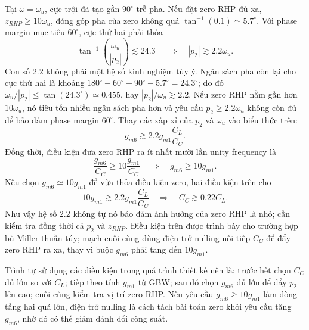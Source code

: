 \documentclass[11pt,a4paper]{report}
\newcommand{\ang}[1]{\ensuremath{#1^{\circ}}}
\begin{document}
Tại $\omega=\omega_u$, cực trội đã tạo gần \ang{90} trễ pha. Nếu đặt zero RHP
đủ xa, $z_{RHP}\ge10\omega_u$, đóng góp pha của zero không quá
$\tan^{-1}(0.1)\simeq\ang{5.7}$. Với phase margin mục tiêu \ang{60}, cực thứ
hai phải thỏa
\begin{equation}
\tan^{-1}\!\left(\frac{\omega_u}{|p_2|}\right)
\lesssim\ang{24.3}
\quad\Longrightarrow\quad
|p_2|\gtrsim2.2\omega_u.
\end{equation}
Con số $2.2$ không phải một hệ số kinh nghiệm tùy ý. Ngân sách pha còn lại cho
cực thứ hai là khoảng
$\ang{180}-\ang{60}-\ang{90}-\ang{5.7}=\ang{24.3}$; do đó
$\omega_u/|p_2|\le\tan(\ang{24.3})\simeq0.455$, hay
$|p_2|/\omega_u\gtrsim2.2$. Nếu zero RHP nằm gần hơn $10\omega_u$, nó tiêu tốn
nhiều ngân sách pha hơn và yêu cầu $p_2\ge2.2\omega_u$ không còn đủ để bảo đảm
phase margin \ang{60}.
Thay các xấp xỉ của $p_2$ và $\omega_u$ vào biểu thức trên:
\begin{equation}
\boxed{g_{m6}\gtrsim2.2g_{m1}\frac{C_L}{C_C}}.
\end{equation}
Đồng thời, điều kiện đưa zero RHP ra ít nhất mười lần unity frequency là
\begin{equation}
\frac{g_{m6}}{C_C}\ge10\frac{g_{m1}}{C_C}
\quad\Longrightarrow\quad
\boxed{g_{m6}\ge10g_{m1}}.
\end{equation}
Nếu chọn $g_{m6}\simeq10g_{m1}$ để vừa thỏa điều kiện zero, hai điều kiện trên
cho
\begin{equation}
10g_{m1}\gtrsim2.2g_{m1}\frac{C_L}{C_C}
\quad\Longrightarrow\quad
\boxed{C_C\gtrsim0.22C_L}.
\end{equation}
Như vậy hệ số $2.2$ không tự nó bảo đảm ảnh hưởng của zero RHP là nhỏ; cần kiểm
tra đồng thời cả $p_2$ và $z_{RHP}$. Điều kiện trên được trình bày cho trường
hợp bù Miller thuần túy; mạch cuối cùng dùng điện trở nulling nối tiếp $C_C$ để
đẩy zero RHP ra xa, thay vì buộc $g_{m6}$ phải tăng đến $10g_{m1}$.

Trình tự sử dụng các điều kiện trong quá trình thiết kế nên là: trước hết chọn
$C_C$ đủ lớn so với $C_L$; tiếp theo tính $g_{m1}$ từ GBW; sau đó chọn $g_{m6}$
đủ lớn để đẩy $p_2$ lên cao; cuối cùng kiểm tra vị trí zero RHP. Nếu yêu cầu
$g_{m6}\ge10g_{m1}$ làm dòng tầng hai quá lớn, điện trở nulling là cách tách bài
toán zero khỏi yêu cầu tăng $g_{m6}$, nhờ đó có thể giảm đánh đổi công suất.
\end{document}
